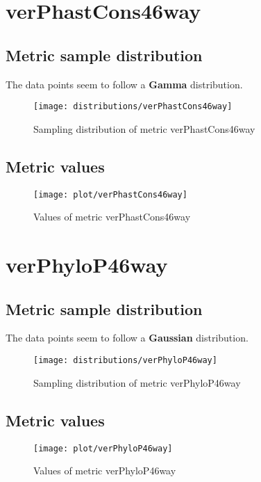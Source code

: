 \documentclass[\main/main.tex]{subfiles}
\begin{document}
\clearpage
\section{verPhastCons46way}
\subsection{Metric sample distribution}
The data points seem to follow a \textbf{Gamma} distribution.

\begin{figure}
  \texttt{[image: distributions/verPhastCons46way]}
  \caption{Sampling distribution of metric verPhastCons46way}
\end{figure}
\subsection{Metric values}
\begin{figure}
  \texttt{[image: plot/verPhastCons46way]}
  \caption{Values of metric verPhastCons46way}
\end{figure}

\clearpage
\section{verPhyloP46way}
\subsection{Metric sample distribution}
The data points seem to follow a \textbf{Gaussian} distribution.
\begin{figure}
  \texttt{[image: distributions/verPhyloP46way]}
  \caption{Sampling distribution of metric verPhyloP46way}
\end{figure}
\subsection{Metric values}
\begin{figure}
  \texttt{[image: plot/verPhyloP46way]}
  \caption{Values of metric verPhyloP46way}
\end{figure}
\end{document}
